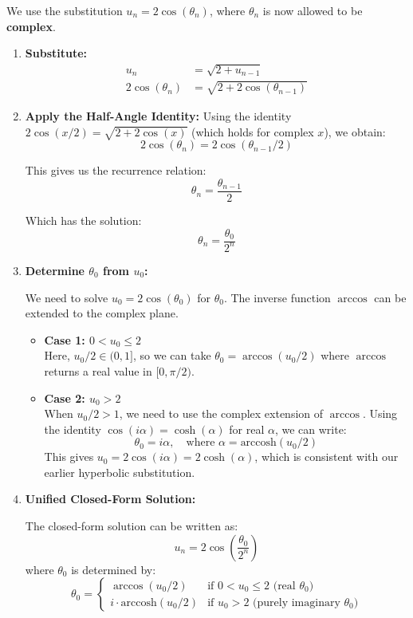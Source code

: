 \documentclass[12pt,a4paper]{article}
\theoremstyle{definition}
\begin{document}
We use the substitution \textbf{$u_n = 2\cos(\theta_n)$}, where $\theta_n$ is now allowed to be \textbf{complex}.

\begin{enumerate}[label=\arabic*.]
    \item \textbf{Substitute:}
    \begin{align*}
    u_n &= \sqrt{2 + u_{n-1}}\\
    2\cos(\theta_n) &= \sqrt{2 + 2\cos(\theta_{n-1})}
    \end{align*}
    
    \item \textbf{Apply the Half-Angle Identity:}
    Using the identity $2\cos(x/2) = \sqrt{2 + 2\cos(x)}$ (which holds for complex $x$), we obtain:
    \[
    2\cos(\theta_n) = 2\cos(\theta_{n-1}/2)
    \]
    
    This gives us the recurrence relation:
    \[
    \theta_n = \frac{\theta_{n-1}}{2}
    \]
    
    Which has the solution:
    \[
    \theta_n = \frac{\theta_0}{2^n}
    \]
    
    \item \textbf{Determine $\theta_0$ from $u_0$:}
    
    We need to solve $u_0 = 2\cos(\theta_0)$ for $\theta_0$. The inverse function $\arccos$ can be extended to the complex plane.
    
    \begin{itemize}
        \item \textbf{Case 1: $0 < u_0 \le 2$}\\
        Here, $u_0/2 \in (0, 1]$, so we can take $\theta_0 = \arccos(u_0/2)$ where $\arccos$ returns a real value in $[0, \pi/2)$.
        
        \item \textbf{Case 2: $u_0 > 2$}\\
        When $u_0/2 > 1$, we need to use the complex extension of $\arccos$. Using the identity $\cos(i\alpha) = \cosh(\alpha)$ for real $\alpha$, we can write:
        \[
        \theta_0 = i\alpha, \quad \text{where } \alpha = \text{arccosh}(u_0/2)
        \]
        This gives $u_0 = 2\cos(i\alpha) = 2\cosh(\alpha)$, which is consistent with our earlier hyperbolic substitution.
    \end{itemize}
    
    \item \textbf{Unified Closed-Form Solution:}
    
    The closed-form solution can be written as:
    \[
    u_n = 2\cos\left(\frac{\theta_0}{2^n}\right)
    \]
    where $\theta_0$ is determined by:
    \[
    \theta_0 = \begin{cases}
        \arccos(u_0/2) & \text{if } 0 < u_0 \le 2 \text{ (real $\theta_0$)}\\
        i\cdot\text{arccosh}(u_0/2) & \text{if } u_0 > 2 \text{ (purely imaginary $\theta_0$)}
    \end{cases}
    \]
    

\end{enumerate}
\end{document}
